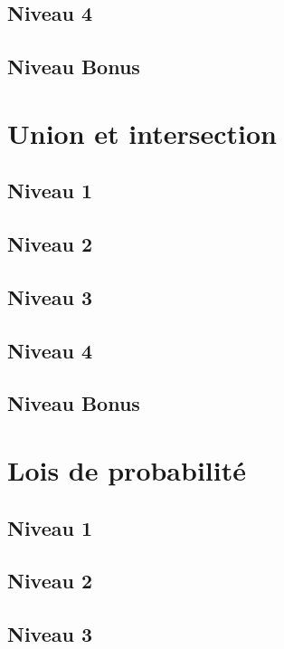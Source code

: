 \documentclass[a4paper]{report}
\begin{document}
			\subsection{Niveau 4}
			
			\subsection{Niveau Bonus}
		
		\section{Union et intersection}
		
			\subsection{Niveau 1}
		
			\subsection{Niveau 2}
		
			\subsection{Niveau 3}
			
			\subsection{Niveau 4}
			
			\subsection{Niveau Bonus}
		
		\section{Lois de probabilité}
		
			\subsection{Niveau 1}
		
			\subsection{Niveau 2}
		
			\subsection{Niveau 3}
			
\end{document}
